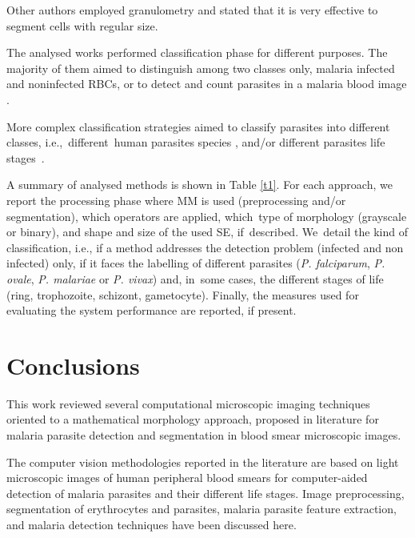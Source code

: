 \documentclass[sensors,review,accept,moreauthors,pdftex,10pt,a4paper]{mdpi}
\begin{document}
Other authors \cite{DiRuberto2002,Khan2011,Mushabe2013,Ross2006,Tek2010} employed granulometry and stated that it is very effective to segment cells with regular size.

The analysed works performed classification phase for different purposes. The majority of them aimed to distinguish among two classes only, malaria infected and noninfected RBCs, or to detect and count parasites in a malaria blood image \cite{Anggraini2011,Arco2014,Das2011,Dave2017,Das2015,DiRuberto2002,Elter2011,Kareem2012,Khan2014,Malihi2013,Mushabe2013,Oliveira2017,Savkare2011b,Savkare2011a,Somasekar2011,Somasekar2015,Somasekar2017,Sulist2015,Tek2006}.

More complex classification strategies aimed to classify parasites into different classes, \mbox{i.e.,  different human} parasites species \cite{Das2013,Das2014,Khan2011,Tek2010},
and/or different parasites life \mbox{stages \cite{Anggraini2011,Das2013,Das2014,DiRuberto2002,Diaz2009,Tek2010}}.

A summary of analysed methods is shown in Table \ref{t1}. For each approach, we report the processing phase where MM is used (preprocessing and/or segmentation), which operators are applied, which~type of morphology (grayscale or binary), and shape and size of the used SE, if~described. We~detail the kind of classification, i.e., if a method addresses the detection problem (infected and non infected) only, if it faces the labelling of different parasites (\emph{P. falciparum}, \emph{P. ovale}, \emph{P. malariae} or \emph{P. vivax}) and, in~some cases, the different stages of life (ring, trophozoite, schizont, gametocyte). Finally, the measures used for evaluating the system performance are reported, if present.


\section{Conclusions}\label{s5}
This work reviewed several computational microscopic imaging techniques oriented to a mathematical morphology approach, proposed in literature for malaria parasite detection and segmentation in blood smear microscopic images.

The computer vision methodologies reported in the literature are based on light microscopic images of human peripheral blood smears for computer-aided detection of malaria parasites and their different life stages.
Image preprocessing, segmentation of erythrocytes and parasites, malaria parasite feature extraction, and malaria detection techniques have been discussed here.
\end{document}
